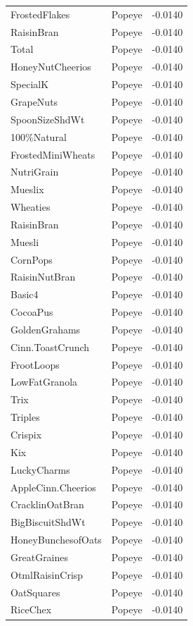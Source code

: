 \begin{table}[!htbp]
\begin{tabular}{lll}
\\
FrostedFlakes & Popeye & -0.0140
\\
RaisinBran & Popeye & -0.0140
\\
Total & Popeye & -0.0140
\\
HoneyNutCheerios & Popeye & -0.0140
\\
SpecialK & Popeye & -0.0140
\\
GrapeNuts & Popeye & -0.0140
\\
SpoonSizeShdWt & Popeye & -0.0140
\\
100\%Natural & Popeye & -0.0140
\\
FrostedMiniWheats & Popeye & -0.0140
\\
NutriGrain & Popeye & -0.0140
\\
Mueslix & Popeye & -0.0140
\\
Wheaties & Popeye & -0.0140
\\
RaisinBran & Popeye & -0.0140
\\
Muesli & Popeye & -0.0140
\\
CornPops & Popeye & -0.0140
\\
RaisinNutBran & Popeye & -0.0140
\\
Basic4 & Popeye & -0.0140
\\
CocoaPus & Popeye & -0.0140
\\
GoldenGrahams & Popeye & -0.0140
\\
Cinn.ToastCrunch & Popeye & -0.0140
\\
FrootLoops & Popeye & -0.0140
\\
LowFatGranola & Popeye & -0.0140
\\
Trix & Popeye & -0.0140
\\
Triples & Popeye & -0.0140
\\
Crispix & Popeye & -0.0140
\\
Kix & Popeye & -0.0140
\\
LuckyCharms & Popeye & -0.0140
\\
AppleCinn.Cheerios & Popeye & -0.0140
\\
CracklinOatBran & Popeye & -0.0140
\\
BigBiscuitShdWt & Popeye & -0.0140
\\
HoneyBunchesofOats & Popeye & -0.0140
\\
GreatGraines & Popeye & -0.0140
\\
OtmlRaisinCrisp & Popeye & -0.0140
\\
OatSquares & Popeye & -0.0140
\\
RiceChex & Popeye & -0.0140
\\

\end{tabular}
\end{table}
